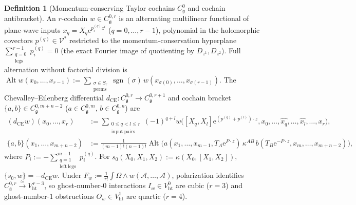 \documentclass[11pt,letterpaper]{article}
\numberwithin{equation}{section}
\theoremstyle{plain}
\theoremstyle{definition}
\newtheorem{definition}[theorem]{Definition}
\theoremstyle{remark}
\newcommand{\ee}{\mathrm{e}}
\newcommand{\fg}{\mathfrak{g}}
\newcommand{\Alt}{\operatorname{Alt}}
\newcommand{\sgn}{\operatorname{sgn}}
\newcommand{\Vht}{V_{\mathrm{ht}}}
\newcommand{\Cg}{C^0_{\fg}}
\begin{document}
\begin{definition}[Momentum-conserving Taylor cochains $\Cg$ and cochain antibracket]
\label{def:taylor-cochains}
An $r$-cochain $w \in C^{0,r}_{\fg}$ is an alternating multilinear functional of plane-wave inputs $x_q = X_q\ee^{p^{(q)}_i z^i}$ ($q = 0,\dots,r-1$), polynomial in the holomorphic covectors $p^{(q)} \in \mathcal{V}^*$ restricted to the momentum-conservation hyperplane $\sum_{\substack{q=0\\\mathrm{legs}}}^{r-1} p^{(q)}_i = 0$ (the exact Fourier image of quotienting by $D_{z^1}, D_{z^2}$). Full alternation without factorial division is $\Alt w(x_0,\dots,x_{r-1}) := \sum_{\substack{\sigma\in S_r\\\mathrm{perms}}}\sgn(\sigma)\,w(x_{\sigma(0)},\dots,x_{\sigma(r-1)})$. The Chevalley--Eilenberg differential $d_{\mathrm{CE}} : C^{0,r}_{\fg} \to C^{0,r+1}_{\fg}$ and cochain bracket $\{a,b\} \in C^{0,m+n-2}_{\fg}$ ($a \in C^{0,m}_{\fg}$, $b \in C^{0,n}_{\fg}$) are
\begin{align}
\label{eq:ce-and-bracket}
(d_{\mathrm{CE}}w)(x_0,\dots,x_r) &:= \sum_{\substack{0\le q<l\le r\\\mathrm{input\ pairs}}} (-1)^{q+l} w\!\big([X_q,X_l]\ee^{(p^{(q)}+p^{(l)})\cdot z}, x_0, \dots, \widehat{x_q}, \dots, \widehat{x_l}, \dots, x_r\big), \\
\{a, b\}(x_1,\dots,x_{m+n-2}) &:= \frac{1}{(m{-}1)!(n{-}1)!}\Alt\!\Big(a(x_1,\dots,x_{m-1}, T_A\ee^{P\cdot z})\,\kappa^{AB}\,b(T_B\ee^{-P\cdot z}, x_m,\dots,x_{m+n-2})\Big), \nonumber
\end{align}
where $P_i := -\sum_{\substack{q=1\\\mathrm{left\ legs}}}^{m-1} p^{(q)}_i$. For $s_0(X_0,X_1,X_2) := \kappa(X_0,[X_1,X_2])$, $\{s_0, w\} = -d_{\mathrm{CE}}w$. Under $F_w := \frac{1}{r!}\int\Omega\wedge w(\mathcal{A},\dots,\mathcal{A})$, polarization identifies $C^{0,r}_{\fg} \xrightarrow{\simeq} \Vht^{\,r-3}$, so ghost-number-$0$ interactions $I_w \in \Vht^0$ are cubic ($r=3$) and ghost-number-$1$ obstructions $O_w \in \Vht^1$ are quartic ($r=4$).
\end{definition}
\end{document}
